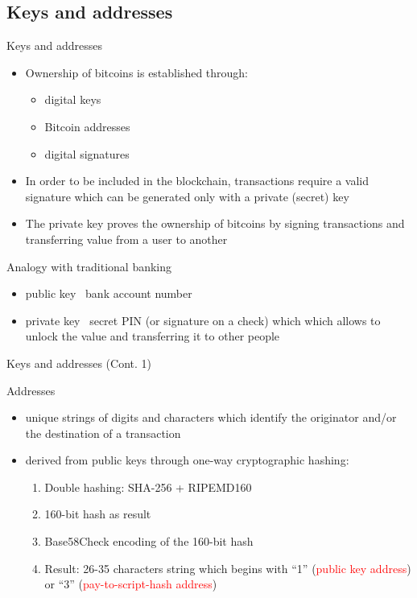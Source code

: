 \documentclass{beamer}
\newcommand\red[1]{\textcolor{red}{#1}}
\begin{document}
  \subsection{Keys and addresses}
  \begin{frame}{Keys and addresses}
    \begin{itemize}
      \item Ownership of bitcoins is established through:
      \begin{itemize}
          \item digital keys
          \item Bitcoin addresses
          \item digital signatures
      \end{itemize} 
      \item In order to be included in the blockchain, transactions require a valid
      signature which can be generated only with a private (secret) key 
      \item The private key proves the ownership of bitcoins by signing transactions and
      transferring value from a user to another \pause
    \end{itemize}
    \begin{block}{Analogy with traditional banking}
      \begin{itemize}
        \item public key \MVRightarrow\, bank account number
        \item private key \MVRightarrow\, secret PIN (or signature on a check)
        which which allows to unlock the value and transferring it to other people
      \end{itemize}
    \end{block}
  \end{frame}





  \begin{frame}{Keys and addresses (Cont. 1)}
    \begin{block}{Addresses}
      \begin{itemize}
        \item unique strings of digits and characters which identify the originator and/or the destination of a transaction \pause
        \item derived from public keys through one-way cryptographic hashing:
        \begin{enumerate}
          \item Double hashing: SHA-256 + RIPEMD160
          \item 160-bit hash as result
          \item Base58Check encoding of the 160-bit hash
          \item Result: 26-35 characters string which begins with “1” (\red{public key
          address}) or “3” (\red{pay-to-script-hash address})
        \end{enumerate}
      \end{itemize}
    \end{block}
  \end{frame}
\end{document}
